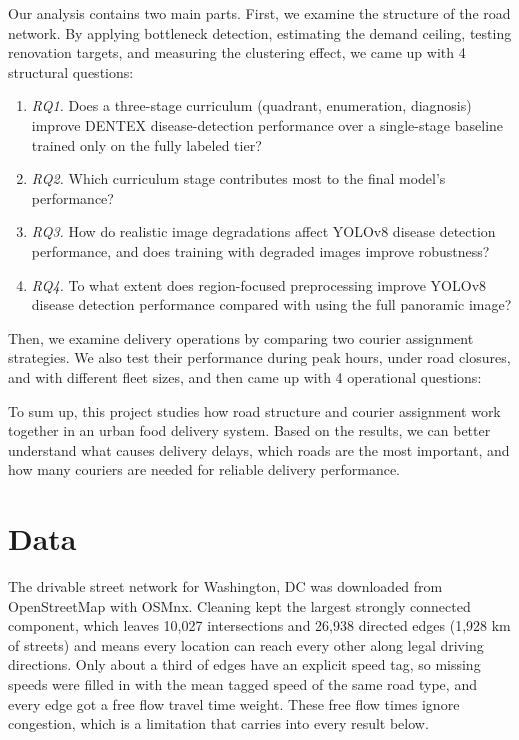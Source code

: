 \documentclass[
  11pt,
]{article}
\providecommand{\tightlist}{%
  \setlength{\itemsep}{0pt}\setlength{\parskip}{0pt}}
\begin{document}
Our analysis contains two main parts. First, we examine the structure of
the road network. By applying bottleneck detection, estimating the
demand ceiling, testing renovation targets, and measuring the clustering
effect, we came up with 4 structural questions:

\begin{enumerate}
\def\labelenumi{\arabic{enumi}.}
\tightlist
\item
  \emph{RQ1.} Does a three-stage curriculum (quadrant, enumeration,
  diagnosis) improve DENTEX disease-detection performance over a
  single-stage baseline trained only on the fully labeled tier?
\item
  \emph{RQ2.} Which curriculum stage contributes most to the final
  model's performance?
\item
  \emph{RQ3.} How do realistic image degradations affect YOLOv8 disease
  detection performance, and does training with degraded images improve
  robustness?
\item
  \emph{RQ4.} To what extent does region-focused preprocessing improve
  YOLOv8 disease detection performance compared with using the full
  panoramic image?
\end{enumerate}

Then, we examine delivery operations by comparing two courier assignment
strategies. We also test their performance during peak hours, under road
closures, and with different fleet sizes, and then came up with 4
operational questions:

To sum up, this project studies how road structure and courier
assignment work together in an urban food delivery system. Based on the
results, we can better understand what causes delivery delays, which
roads are the most important, and how many couriers are needed for
reliable delivery performance.

\section{Data}\label{data}

The drivable street network for Washington, DC was downloaded from
OpenStreetMap with OSMnx. Cleaning kept the largest strongly connected
component, which leaves 10,027 intersections and 26,938 directed edges
(1,928 km of streets) and means every location can reach every other
along legal driving directions. Only about a third of edges have an
explicit speed tag, so missing speeds were filled in with the mean
tagged speed of the same road type, and every edge got a free flow
travel time weight. These free flow times ignore congestion, which is a
limitation that carries into every result below.
\end{document}
